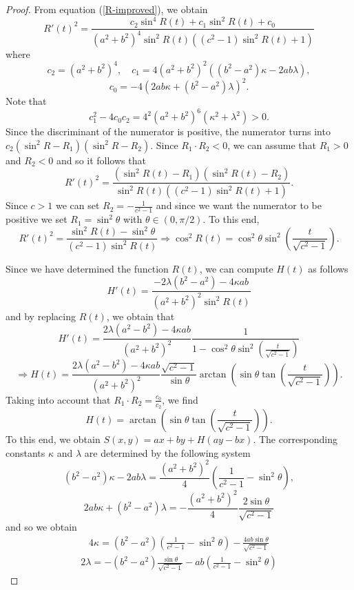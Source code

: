\documentclass[10pt,a4paper]{amsart}
\begin{document}
	\begin{proof}
		From equation (\ref{R-improved}), we obtain
		\[
		R'(t)^2 = \frac{c_2\sin^4R(t) + c_1\sin^2R(t) + c_0}
		{(a^2 + b^2)^4\sin^2R(t)((c^2 - 1)\sin^2R(t) + 1)}
		\]
		where 
		\[
		c_2 = (a^2 + b^2)^4, \quad 
		c_1 = 4(a^2 + b^2)^2
		\left(
		(b^2 - a^2)\kappa - 2ab\lambda
		\right),
		\]
		\[
		c_0 = - 4\left(
		2ab\kappa + (b^2 - a^2)\lambda
		\right)^2.
		\]
		Note that 
		\[c_{1}^2-4c_0 c_2 = 4^2 (a^2+b^2)^6 (\kappa^2 + \lambda^2) > 0.\]
		Since the discriminant of the numerator is positive, the numerator turns into $c_2(\sin^2R - R_1)(\sin^2R - R_2)$. Since $R_1 \cdot R_2 < 0$,  we can assume that $R_1 > 0$ and $R_2 < 0$ and so it follows that
		\[
		R'(t)^2 = \frac
		{(\sin^2 R(t) - R_1)(\sin^2 R(t) - R_2)}
		{\sin^2R(t)
			\left((c^2 - 1)\sin^2R(t) + 1\right)}.
		\]
		Since $c > 1$ we can set $R_2 = - \frac{1}{c^2 - 1}$ and since we want the numerator to be positive we set $R_1 = \sin^2\theta$ with $\theta \in (0,\pi/2)$. To this end, 
		\[
		R'(t)^2 = \frac{\sin^2 R(t) - \sin^2\theta}
		{(c^2 - 1)\sin^2R(t)}
		\Rightarrow
		\cos^2R(t) = \cos^2\theta\sin^2
		\left(\frac{t}{\sqrt{c^2 - 1}}\right).
		\]
		
		
		Since we have determined the function $R(t)$, we can compute $H(t)$ as follows
		\[
		H'(t) = \frac{-2\lambda(b^2 - a^2) - 4\kappa ab}
		{(a^2 + b^2)^2 \sin^2R(t)}
		\]
		and by replacing $R(t)$, we obtain that
		\[
		H'(t) = \frac{2\lambda(a^2 - b^2) - 4\kappa ab}{(a^2 + b^2)^2}
		\frac{1}{1 - \cos^2\theta \sin^2(\frac{t}{\sqrt{c^2 - 1}})}
		\]
		\[
		\Rightarrow
		H(t) = 
		\frac{2\lambda(a^2 - b^2) - 4\kappa ab}{(a^2 + b^2)^2}
		\frac{\sqrt{c^2 - 1}}{\sin\theta}
		\arctan
		\left(
		\sin\theta \tan(\frac{t}{\sqrt{c^2 - 1}})
		\right).
		\]
		Taking into account that $R_1\cdot R_2 = \frac{c_0}{c_2}$, we find 
		\[
		H(t) =  \arctan
		\left(
		\sin\theta
		\tan
		\left(
		\frac{t}{\sqrt{c^2 - 1}}
		\right)
		\right).
		\]
		To this end, we obtain $S(x,y) = ax + by + H(ay - bx)$.
		The corresponding constants $\kappa$ and $\lambda$ are determined by the following system
		\[
		(b^2 - a^2)\kappa - 2ab\lambda = 
		\frac{(a^2 + b^2)^2}{4}
		\left(
		\frac{1}{c^2 - 1} - \sin^2\theta
		\right),
		\]
		\[
		2ab\kappa + (b^2 - a^2)\lambda = 
		- 
		\frac{(a^2 + b^2)^2}{4}
		\frac{2\sin\theta}{\sqrt{c^2- 1}}
		\]
		and so we obtain
		\begin{align}\label{kappa}
			4\kappa = 
			(b^2 - a^2)
			\left(\frac{1}{c^2 - 1} - \sin^2\theta\right) - 
			\frac{4ab\sin\theta}{\sqrt{c^2 - 1}}
		\end{align}
		\begin{align}\label{lambda}
			2\lambda= 
			-(b^2 - a^2)\frac{\sin\theta}{\sqrt{c^2 - 1}}
			- ab\left(\frac{1}{c^2 - 1} - \sin^2\theta\right)
		\end{align}
		

\end{proof}
\end{document}
